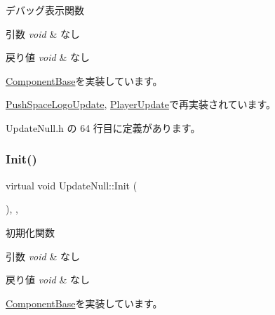 デバッグ表示関数 


\begin{DoxyParams}{引数}
{\em void} & なし \\
\hline
\end{DoxyParams}

\begin{DoxyRetVals}{戻り値}
{\em void} & なし \\
\hline
\end{DoxyRetVals}


\mbox{\hyperlink{class_component_base_a36ae7d27ad9d756fa245bad443020407}{Component\+Base}}を実装しています。



\mbox{\hyperlink{class_push_space_logo_update_ab18a0c905455da17f9e2f1fe5f0c34e6}{Push\+Space\+Logo\+Update}}, \mbox{\hyperlink{class_player_update_ac15fd0faf356c6e66f6c62c2b6b8d3ac}{Player\+Update}}で再実装されています。



 Update\+Null.\+h の 64 行目に定義があります。

\mbox{\label{class_update_null_abe9bc57c7932d2de47073c2709007432}} 
\subsubsection{\texorpdfstring{Init()}{Init()}}
{\footnotesize\ttfamily virtual void Update\+Null\+::\+Init (\begin{DoxyParamCaption}{ }\end{DoxyParamCaption})\hspace{0.3cm}{\ttfamily [inline]}, {\ttfamily [override]}, {\ttfamily [virtual]}}



初期化関数 


\begin{DoxyParams}{引数}
{\em void} & なし \\
\hline
\end{DoxyParams}

\begin{DoxyRetVals}{戻り値}
{\em void} & なし \\
\hline
\end{DoxyRetVals}


\mbox{\hyperlink{class_component_base_a125939d6befe42f28886a6523e86b18b}{Component\+Base}}を実装しています。



